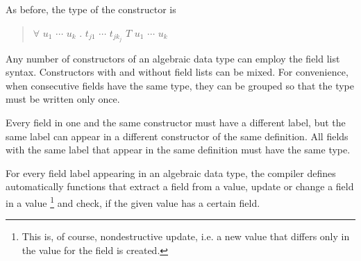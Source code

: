 
As before, the type of the constructor is

\begin{quote}
$\forall$ $u_1$ $\cdots$ $u_k$ . $t_{j1}$ \arrow{} $\cdots$ \arrow{} $t_{jk_j}$ \arrow{} $T$ $u_1$ $\cdots$ $u_k$
\end{quote}

Any number of constructors of an algebraic data type can employ the field list syntax. 
Constructors with and without field lists can be mixed.
For convenience, when consecutive fields have the same type, they can be grouped so that the type must be written only once.



Every field in one and the same constructor must have a different label, but the same label can appear in a different constructor of the same  definition. 
All fields with the same label that appear in the same  definition must have the same type.


For every field label appearing in an algebraic data type, 
the compiler defines automatically functions that extract a field from a value,
update or change a field in a value
\footnote{This is, of course, nondestructive update, i.e. a new value that differs only in the value for the field is created.} 
and check, if the given value has a certain field.



